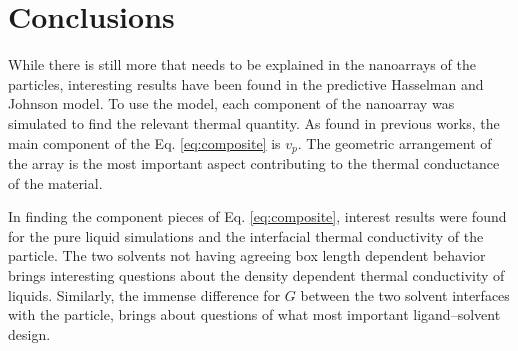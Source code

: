 \section{Conclusions}
While there is still more that needs to be explained in the nanoarrays of the  particles, interesting results have been found in the predictive Hasselman and Johnson model. 
To use the model, each component of the nanoarray was simulated to find the relevant thermal quantity. 
As found in previous works, the main component of the Eq. \ref{eq:composite} is $v_p$. 
The geometric arrangement of the array is the most important aspect contributing to the thermal conductance of the material.

In finding the component pieces of Eq. \ref{eq:composite}, interest results were found for the pure liquid simulations and the interfacial thermal conductivity of the particle.
The two solvents not having agreeing box length dependent behavior brings interesting questions about the density dependent thermal conductivity of liquids.
Similarly, the immense difference for $G$ between the two solvent interfaces with the particle, brings about questions of what most important ligand--solvent design.
